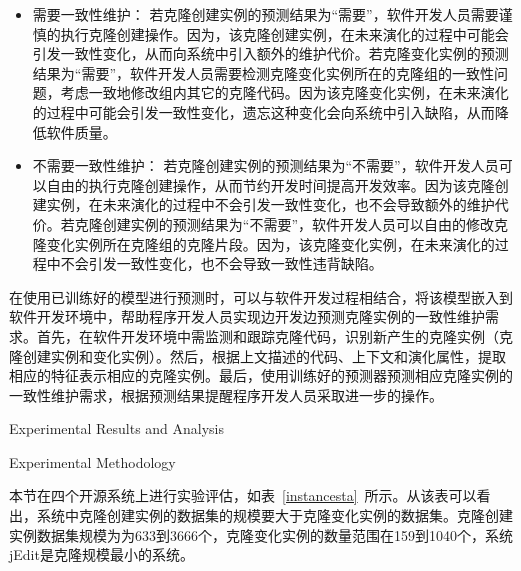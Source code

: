 \begin{itemize}
\item 
需要一致性维护：
若克隆创建实例的预测结果为“需要”，软件开发人员需要谨慎的执行克隆创建操作。因为，该克隆创建实例，在未来演化的过程中可能会引发一致性变化，从而向系统中引入额外的维护代价。若克隆变化实例的预测结果为“需要”，软件开发人员需要检测克隆变化实例所在的克隆组的一致性问题，考虑一致地修改组内其它的克隆代码。因为该克隆变化实例，在未来演化的过程中可能会引发一致性变化，遗忘这种变化会向系统中引入缺陷，从而降低软件质量。
\item
不需要一致性维护：
若克隆创建实例的预测结果为“不需要”，软件开发人员可以自由的执行克隆创建操作，从而节约开发时间提高开发效率。因为该克隆创建实例，在未来演化的过程中不会引发一致性变化，也不会导致额外的维护代价。若克隆创建实例的预测结果为“不需要”，软件开发人员可以自由的修改克隆变化实例所在克隆组的克隆片段。因为，该克隆变化实例，在未来演化的过程中不会引发一致性变化，也不会导致一致性违背缺陷。
\end{itemize}

在使用已训练好的模型进行预测时，可以与软件开发过程相结合，将该模型嵌入到软件开发环境中，帮助程序开发人员实现边开发边预测克隆实例的一致性维护需求。首先，在软件开发环境中需监测和跟踪克隆代码，识别新产生的克隆实例（克隆创建实例和变化实例）。然后，根据上文描述的代码、上下文和演化属性，提取相应的特征表示相应的克隆实例。最后，使用训练好的预测器预测相应克隆实例的一致性维护需求，根据预测结果提醒程序开发人员采取进一步的操作。

{Experimental Results and Analysis}


{Experimental Methodology}

本节在四个开源系统上进行实验评估，如表~\ref{instancesta}~所示。从该表可以看出，系统中克隆创建实例的数据集的规模要大于克隆变化实例的数据集。克隆创建实例数据集规模为为633到3666个，克隆变化实例的数量范围在159到1040个，系统jEdit是克隆规模最小的系统。



